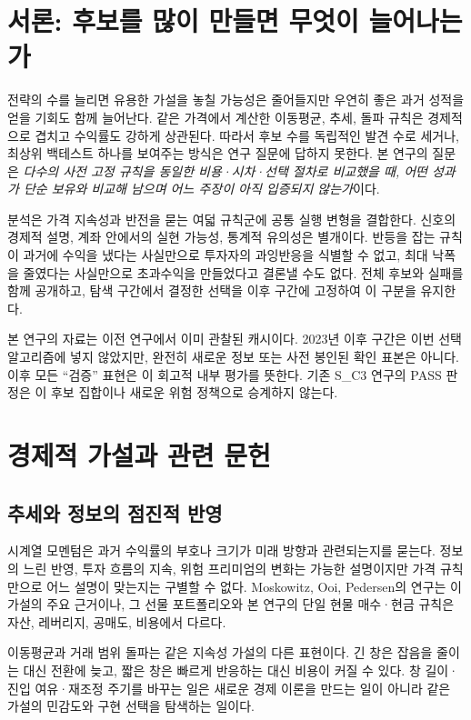 \documentclass[11pt,a4paper]{article}
\begin{document}
\section{서론: 후보를 많이 만들면 무엇이 늘어나는가}
전략의 수를 늘리면 유용한 가설을 놓칠 가능성은 줄어들지만 우연히 좋은 과거 성적을 얻을 기회도 함께 늘어난다. 같은 가격에서 계산한 이동평균, 추세, 돌파 규칙은 경제적으로 겹치고 수익률도 강하게 상관된다. 따라서 후보 수를 독립적인 발견 수로 세거나, 최상위 백테스트 하나를 보여주는 방식은 연구 질문에 답하지 못한다. 본 연구의 질문은 \emph{다수의 사전 고정 규칙을 동일한 비용·시차·선택 절차로 비교했을 때, 어떤 성과가 단순 보유와 비교해 남으며 어느 주장이 아직 입증되지 않는가}이다.

분석은 가격 지속성과 반전을 묻는 여덟 규칙군에 공통 실행 변형을 결합한다. 신호의 경제적 설명, 계좌 안에서의 실현 가능성, 통계적 유의성은 별개이다. 반등을 잡는 규칙이 과거에 수익을 냈다는 사실만으로 투자자의 과잉반응을 식별할 수 없고, 최대 낙폭을 줄였다는 사실만으로 초과수익을 만들었다고 결론낼 수도 없다. 전체 후보와 실패를 함께 공개하고, 탐색 구간에서 결정한 선택을 이후 구간에 고정하여 이 구분을 유지한다.

본 연구의 자료는 이전 연구에서 이미 관찰된 캐시이다. 2023년 이후 구간은 이번 선택 알고리즘에 넣지 않았지만, 완전히 새로운 정보 또는 사전 봉인된 확인 표본은 아니다. 이후 모든 ``검증'' 표현은 이 회고적 내부 평가를 뜻한다. 기존 S\_C3 연구의 PASS 판정은 이 후보 집합이나 새로운 위험 정책으로 승계하지 않는다.

\section{경제적 가설과 관련 문헌}
\subsection{추세와 정보의 점진적 반영}
시계열 모멘텀은 과거 수익률의 부호나 크기가 미래 방향과 관련되는지를 묻는다. 정보의 느린 반영, 투자 흐름의 지속, 위험 프리미엄의 변화는 가능한 설명이지만 가격 규칙만으로 어느 설명이 맞는지는 구별할 수 없다. Moskowitz, Ooi, Pedersen의 연구\cite{tsmom}는 이 가설의 주요 근거이나, 그 선물 포트폴리오와 본 연구의 단일 현물 매수·현금 규칙은 자산, 레버리지, 공매도, 비용에서 다르다.

이동평균과 거래 범위 돌파는 같은 지속성 가설의 다른 표현이다\cite{technical}. 긴 창은 잡음을 줄이는 대신 전환에 늦고, 짧은 창은 빠르게 반응하는 대신 비용이 커질 수 있다. 창 길이·진입 여유·재조정 주기를 바꾸는 일은 새로운 경제 이론을 만드는 일이 아니라 같은 가설의 민감도와 구현 선택을 탐색하는 일이다.
\end{document}
